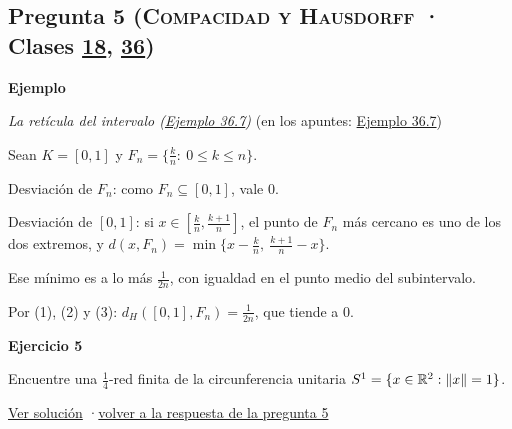 \documentclass[11pt,a4paper]{article}
\newcommand{\R}{\mathbb{R}}\newcommand{\N}{\mathbb{N}}\newcommand{\Q}{\mathbb{Q}}
\newcommand{\bloque}[1]{\par\smallskip\noindent\textbf{\color{acento}#1}\par}
\begin{document}
\subsection*{\hypertarget{e-5}{}Pregunta 5 \normalfont\small(\textsc{Compacidad y Hausdorff} · Clases \href{https://decostruttivismo.github.io/MAT2514-repaso/pdf/MAT2514_apuntes_completos.pdf\#nameddest=section.18}{18}, \href{https://decostruttivismo.github.io/MAT2514-repaso/pdf/MAT2514_apuntes_completos.pdf\#nameddest=section.36}{36})}
\bloque{Ejemplo}
\textit{La retícula del intervalo (\href{https://decostruttivismo.github.io/MAT2514-repaso/pdf/MAT2514_apuntes_completos.pdf\#nameddest=teorema.36.7}{Ejemplo 36.7})} {\small(en los apuntes: \href{https://decostruttivismo.github.io/MAT2514-repaso/pdf/MAT2514_apuntes_completos.pdf\#nameddest=teorema.36.7}{Ejemplo 36.7})}
\begin{pasos}
\item[] Sean $K=[0,1]$ y $F_n=\{\frac kn:\ 0\le k\le n\}$.
\item[(1)] Desviación de $F_n$: como $F_n\subseteq[0,1]$, vale $0$.
\item[(2)] Desviación de $[0,1]$: si $x\in[\frac kn,\frac{k+1}n]$, el punto de $F_n$ más cercano es uno de los dos extremos, y $d(x,F_n)=\min\{x-\frac kn,\ \frac{k+1}n-x\}$.
\item[(3)] Ese mínimo es a lo más $\frac1{2n}$, con igualdad en el punto medio del subintervalo.
\item[] Por (1), (2) y (3): $d_H([0,1],F_n)=\frac1{2n}$, que tiende a $0$.
\end{pasos}
\bloque{\hypertarget{x-5}{}Ejercicio 5}
Encuentre una $\frac14$-red finita de la circunferencia unitaria $S^1=\{x\in\R^2:\norm x=1\}$.
\par{\small \hyperlink{s-5}{Ver solución} \quad·\quad \hyperlink{r-5}{volver a la respuesta de la pregunta 5}}
\end{document}
